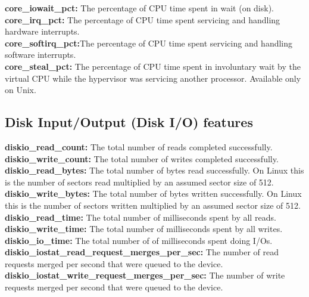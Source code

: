 \documentclass{iosart2c}
\begin{document}
\textbf{core\_iowait\_pct:} The percentage of CPU time spent in wait (on disk).\\

\textbf{core\_irq\_pct:} The percentage of CPU time spent servicing and handling hardware interrupts.\\

\textbf{core\_softirq\_pct:}The percentage of CPU time spent servicing and handling software interrupts.\\

\textbf{core\_steal\_pct:}  The percentage of CPU time spent in involuntary wait by the virtual CPU while the hypervisor was servicing another processor. Available only on Unix.


\subsection{Disk Input/Output (Disk I/O) features}

\textbf{diskio\_read\_count:} The total number of reads completed successfully.\\

\textbf{diskio\_write\_count:} The total number of writes completed successfully.\\

\textbf{diskio\_read\_bytes:} The total number of bytes read successfully. On Linux this is the number of sectors read multiplied by an assumed sector size of 512.\\

\textbf{diskio\_write\_bytes:} The total number of bytes written successfully. On Linux this is the number of sectors written multiplied by an assumed sector size of 512.\\

\textbf{diskio\_read\_time:} The total number of milliseconds spent by all reads.\\

\textbf{diskio\_write\_time:} The total number of milliseconds spent by all writes.\\

\textbf{diskio\_io\_time:} The total number of of milliseconds spent doing I/Os.\\

\textbf{diskio\_iostat\_read\_request\_merges\_per\_sec:} The number of read requests merged per second that were queued to the device.\\

\textbf{diskio\_iostat\_write\_request\_merges\_per\_sec:} The number of write requests merged per second that were queued to the device.\\
\end{document}
